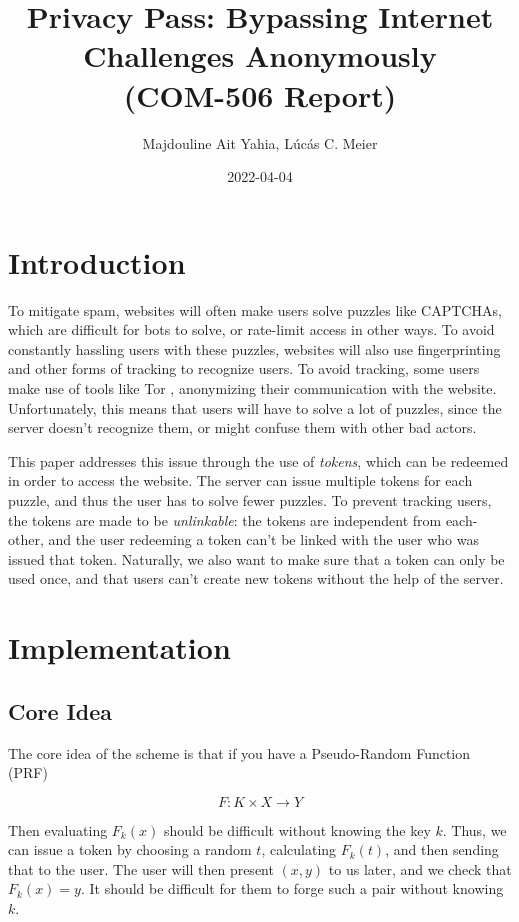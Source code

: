 \documentclass[9pt, a4paper]{article}
\date{2022-04-04}
\title{Privacy Pass: Bypassing Internet Challenges Anonymously\\
\large (COM-506 Report)
}
\author{Majdouline Ait Yahia, Lúcás C. Meier}
\begin{document}
\maketitle

\section{Introduction}

To mitigate spam, websites will often make users solve puzzles like CAPTCHAs,
which are difficult for bots to solve, or rate-limit access in other ways.
To avoid constantly hassling users with these puzzles, websites will
also use fingerprinting and other forms of tracking to recognize users.
To avoid tracking, some users make use of tools like Tor \cite{tor_2004},
anonymizing their communication with the website. Unfortunately,
this means that users will have to solve a lot of puzzles, since the
server doesn't recognize them, or might confuse them with other bad actors.

This paper \cite{davidson_privacy_2018} addresses this issue through
the use of \emph{tokens}, which can be redeemed in order
to access the website.
The server can issue multiple tokens for each puzzle,
and thus the user has to solve fewer puzzles. To prevent tracking users,
the tokens are made to be \emph{unlinkable}: the tokens
are independent from each-other, and the user redeeming
a token can't be linked with the user who was issued that token.
Naturally, we also want to make sure that a token can only be used once,
and that users can't create new tokens without the help of the server.


\section{Implementation}

\subsection{Core Idea}

The core idea of the scheme is that if you have a Pseudo-Random Function (PRF)

$$
F : K \times X \to Y
$$

Then evaluating $F_k(x)$ should be difficult without knowing the key $k$. Thus,
we can issue a token by choosing a random $t$, calculating $F_k(t)$,
and then sending that to the user. The user will then present
$(x, y)$ to us later, and we check that $F_k(x) = y$. It should be difficult
for them to forge such a pair without knowing $k$.
\end{document}
